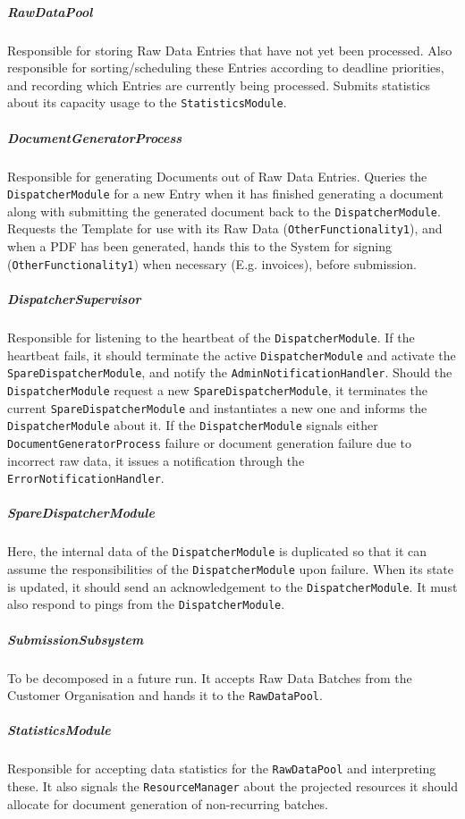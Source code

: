 \documentclass[a4paper,10pt]{article}
\begin{document}
\subparagraph{RawDataPool}
Responsible for storing Raw Data Entries that have not yet been processed. Also responsible for sorting/scheduling these Entries according to deadline priorities, and recording which Entries are currently being processed. Submits statistics about its capacity usage to the \texttt{StatisticsModule}.

\subparagraph{DocumentGeneratorProcess}
Responsible for generating Documents out of Raw Data Entries. Queries the \texttt{DispatcherModule} for a new Entry when it has finished generating a document along with submitting the generated document back to the \texttt{DispatcherModule}. Requests the Template for use with its Raw Data (\texttt{OtherFunctionality1}), and when a PDF has been generated, hands this to the System for signing (\texttt{OtherFunctionality1}) when necessary (E.g. invoices), before submission.

\subparagraph{DispatcherSupervisor}
Responsible for listening to the heartbeat of the \texttt{DispatcherModule}. If the heartbeat fails, it should terminate the active \texttt{DispatcherModule} and activate the \texttt{SpareDispatcherModule}, and notify the \texttt{AdminNotificationHandler}. Should the \texttt{DispatcherModule} request a new \texttt{SpareDispatcherModule}, it terminates the current \texttt{SpareDispatcherModule} and instantiates a new one and informs the \texttt{DispatcherModule} about it. If the \texttt{DispatcherModule} signals either \texttt{DocumentGeneratorProcess} failure or document generation failure due to incorrect raw data, it issues a notification through the \texttt{ErrorNotificationHandler}.

\subparagraph{SpareDispatcherModule}
Here, the internal data of the \texttt{DispatcherModule} is duplicated so that it can assume the responsibilities of the \texttt{DispatcherModule} upon failure. When its state is updated, it should send an acknowledgement to the \texttt{DispatcherModule}. It must also respond to pings from the \texttt{DispatcherModule}.

\subparagraph{SubmissionSubsystem}
To be decomposed in a future run. It accepts Raw Data Batches from the Customer Organisation and hands it to the \texttt{RawDataPool}.

\subparagraph{StatisticsModule}
Responsible for accepting data statistics for the \texttt{RawDataPool} and interpreting these. It also signals the \texttt{ResourceManager} about the projected resources it should allocate for document generation of non-recurring batches.
\end{document}
